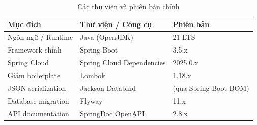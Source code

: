 \documentclass[../DoAn.tex]{subfiles}
\begin{document}
\begin{table}[H]
\centering
\caption{Các thư viện và phiên bản chính}
\label{table:dev-tools}
\begin{compacttable}
\begin{tabularx}{\textwidth}{|L{3.5cm}|Y|L{3cm}|}
\hline
\textbf{Mục đích} & \textbf{Thư viện / Công cụ} & \textbf{Phiên bản} \\ \hline
Ngôn ngữ / Runtime   & Java (OpenJDK)            & 21 LTS \\ \hline
Framework chính      & Spring Boot               & 3.5.x \\ \hline
Spring Cloud         & Spring Cloud Dependencies & 2025.0.x \\ \hline
Giảm boilerplate     & Lombok                    & 1.18.x \\ \hline
JSON serialization   & Jackson Databind          & (qua Spring Boot BOM) \\ \hline
Database migration   & Flyway                    & 11.x \\ \hline
API documentation    & SpringDoc OpenAPI         & 2.8.x \\ \hline
\end{tabularx}
\end{compacttable}
\end{table}

\end{document}
